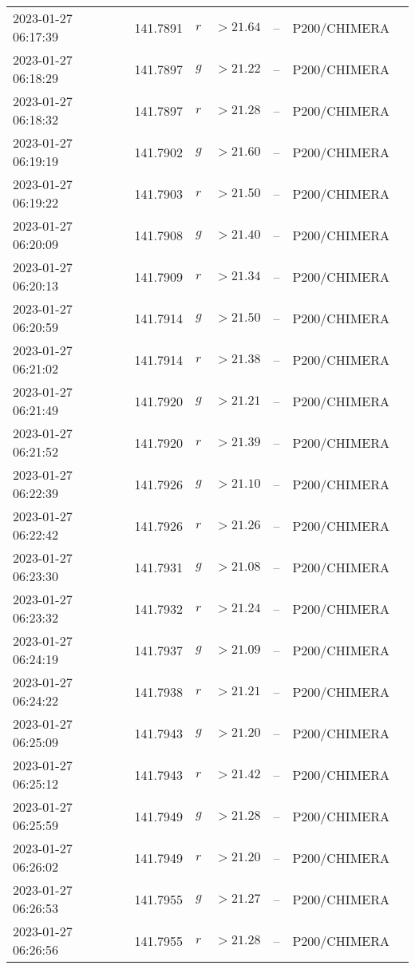 \documentclass{nature_plusfigure}
\begin{document}
\begin{supplement}
\begin{center}
\begin{longtable}{lllllll}
2023-01-27 06:17:39 & 141.7891 & $r$ & $>21.64$ & -- & P200/CHIMERA &  \\ 
2023-01-27 06:18:29 & 141.7897 & $g$ & $>21.22$ & -- & P200/CHIMERA &  \\ 
2023-01-27 06:18:32 & 141.7897 & $r$ & $>21.28$ & -- & P200/CHIMERA &  \\ 
2023-01-27 06:19:19 & 141.7902 & $g$ & $>21.60$ & -- & P200/CHIMERA &  \\ 
2023-01-27 06:19:22 & 141.7903 & $r$ & $>21.50$ & -- & P200/CHIMERA &  \\ 
2023-01-27 06:20:09 & 141.7908 & $g$ & $>21.40$ & -- & P200/CHIMERA &  \\ 
2023-01-27 06:20:13 & 141.7909 & $r$ & $>21.34$ & -- & P200/CHIMERA &  \\ 
2023-01-27 06:20:59 & 141.7914 & $g$ & $>21.50$ & -- & P200/CHIMERA &  \\ 
2023-01-27 06:21:02 & 141.7914 & $r$ & $>21.38$ & -- & P200/CHIMERA &  \\ 
2023-01-27 06:21:49 & 141.7920 & $g$ & $>21.21$ & -- & P200/CHIMERA &  \\ 
2023-01-27 06:21:52 & 141.7920 & $r$ & $>21.39$ & -- & P200/CHIMERA &  \\ 
2023-01-27 06:22:39 & 141.7926 & $g$ & $>21.10$ & -- & P200/CHIMERA &  \\ 
2023-01-27 06:22:42 & 141.7926 & $r$ & $>21.26$ & -- & P200/CHIMERA &  \\ 
2023-01-27 06:23:30 & 141.7931 & $g$ & $>21.08$ & -- & P200/CHIMERA &  \\ 
2023-01-27 06:23:32 & 141.7932 & $r$ & $>21.24$ & -- & P200/CHIMERA &  \\ 
2023-01-27 06:24:19 & 141.7937 & $g$ & $>21.09$ & -- & P200/CHIMERA &  \\ 
2023-01-27 06:24:22 & 141.7938 & $r$ & $>21.21$ & -- & P200/CHIMERA &  \\ 
2023-01-27 06:25:09 & 141.7943 & $g$ & $>21.20$ & -- & P200/CHIMERA &  \\ 
2023-01-27 06:25:12 & 141.7943 & $r$ & $>21.42$ & -- & P200/CHIMERA &  \\ 
2023-01-27 06:25:59 & 141.7949 & $g$ & $>21.28$ & -- & P200/CHIMERA &  \\ 
2023-01-27 06:26:02 & 141.7949 & $r$ & $>21.20$ & -- & P200/CHIMERA &  \\ 
2023-01-27 06:26:53 & 141.7955 & $g$ & $>21.27$ & -- & P200/CHIMERA &  \\ 
2023-01-27 06:26:56 & 141.7955 & $r$ & $>21.28$ & -- & P200/CHIMERA &  \\ 

\end{longtable}
\end{center}
\end{supplement}
\end{document}
